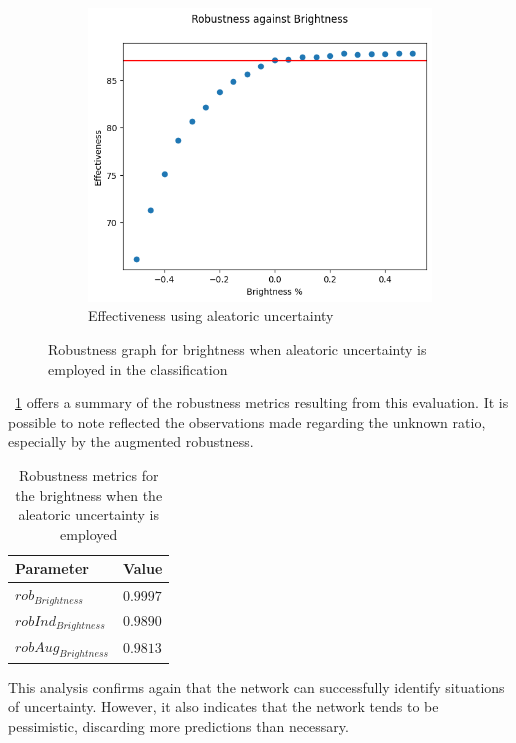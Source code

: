 \begin{figure}[h]
\begin{subfigure}{.33\textwidth}
		\centering
		\includegraphics[width=0.9\linewidth]{ImageFiles/EvalBNN/BR/AU/eff}
		\caption{Effectiveness using aleatoric uncertainty}
		\label{fig:br_au_eff}
	\end{subfigure}
	\caption{Robustness graph for brightness when aleatoric uncertainty is employed in the classification}
	\label{fig:br_au}
\end{figure}

\Tab~\ref{table:rob_br_au} offers a summary of the robustness metrics resulting from this evaluation. It is possible to note reflected the observations made regarding the unknown ratio, especially by the augmented robustness.

\begin{table}[h]
	\centering
	\begin{tabular}{|| l | l ||} 
		\hline
		\textbf{Parameter} & \textbf{Value} \\
		\hline
		\hline
		$rob_{Brightness}$ & $0.9997$ \\
		$robInd_{Brightness}$ & $0.9890$ \\
		$robAug_{Brightness}$ & $0.9813$ \\	
		\hline
	\end{tabular}	
	\caption{Robustness metrics for the brightness when the aleatoric uncertainty is employed}
	\label{table:rob_br_au}
\end{table}

This analysis confirms again that the network can successfully identify situations of uncertainty. However, it also indicates that the network tends to be pessimistic, discarding more predictions than necessary.

